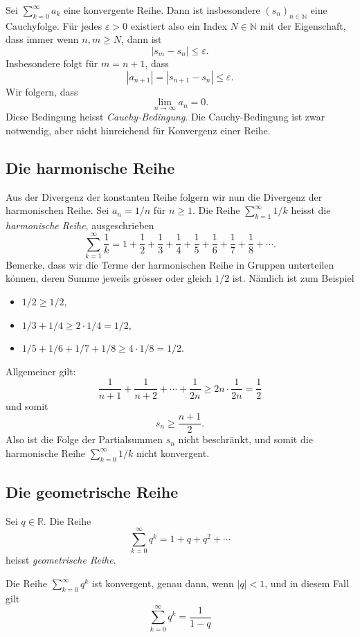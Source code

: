 \documentclass[../main.tex]{subfiles}
\begin{document}
\begin{remark}
  Sei $\sum_{k=0}^{\infty} a_k$ eine konvergente Reihe.
  Dann ist insbesondere ${(s_{n})}_{n \in \mathbb{N}}$ 
  eine Cauchyfolge.
  Für jedes $\varepsilon > 0$ existiert also ein Index
  $N \in \mathbb{N}$ mit der Eigenschaft, dass
  immer wenn $n, m \geq N$, dann ist
  \[
    |s_m - s_n| \leq \varepsilon.
  \]
  Insbesondere folgt für $m = n + 1$, dass
  \[
    |a_{n+1}| = |s_{n+1} - s_n| \leq \varepsilon.
  \]
  Wir folgern, dass
  \[
    \lim_{n \to \infty}a_n = 0.
  \]
  Diese Bedingung heisst  \emph{Cauchy-Bedingung}.
  Die Cauchy-Bedingung ist zwar notwendig, aber nicht
  hinreichend für Konvergenz einer Reihe.
\end{remark}

\subsection*{Die harmonische Reihe}
Aus der Divergenz der konstanten Reihe folgern wir
nun die Divergenz der harmonischen Reihe.
Sei $a_n = 1/n$ für $n \geq 1$. Die Reihe
$\sum_{k=1}^{\infty} 1/k$ heisst die
\emph{harmonische Reihe}, ausgeschrieben
\[
  \sum_{k=1}^{\infty} \frac{1}{k} = 
  1 + \frac{1}{2} + \frac{1}{3}
  + \frac{1}{4}
  + \frac{1}{5}
  + \frac{1}{6}
  + \frac{1}{7}
  + \frac{1}{8}
  + \cdots.
\]
Bemerke, dass wir die Terme der harmonischen Reihe
in Gruppen unterteilen können, deren Summe
jeweils grösser oder gleich $1/2$ ist. Nämlich ist
zum Beispiel
\begin{itemize}
  \item $1/2 \geq 1/2$,
  \item $1/3 + 1/4 \geq 2\cdot 1/4 = 1/2$,
  \item $1/5 + 1/6 + 1/7 + 1/8 \geq 4 \cdot 1/8 = 1/2$.
\end{itemize}
Allgemeiner gilt:
\[
  \frac{1}{n+1} + \frac{1}{n+2} + \cdots + \frac{1}{2n}
  \geq 2n \cdot \frac{1}{2n} = \frac{1}{2}
\]
und somit
\[
  s_n \geq \frac{n + 1}{2}.
\]
Also ist die Folge der Partialsummen $s_n$ nicht
beschränkt, und somit die 
harmonische Reihe 
$\sum_{k=0}^{\infty} 1/k$ nicht konvergent.

\subsection*{Die geometrische Reihe}
Sei $q \in \mathbb{R}$. Die Reihe
\[
  \sum_{k=0}^{\infty} q^k = 1 + q + q^2 + \cdots
\]
heisst \emph{geometrische Reihe}.


\begin{claim}
  Die Reihe
  $\sum_{k=0}^{\infty} q^k$ ist konvergent, genau dann,
  wenn $|q| < 1$, und in diesem Fall gilt
  \[
    \sum_{k=0}^{\infty} q^k = \frac{1}{1-q}
  \]
\end{claim}
\end{document}

